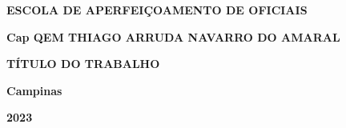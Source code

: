 \documentclass[12pt,a4paper]{article}
\begin{document}
\begin{titlepage}
    \centering
    \onehalfspacing
    \textbf{\Large ESCOLA DE APERFEIÇOAMENTO DE OFICIAIS} %
    
    \vspace{2\baselineskip} %

    \textbf{Cap QEM THIAGO ARRUDA NAVARRO DO AMARAL} %

    \vspace{7\baselineskip} %

    \textbf{TÍTULO DO TRABALHO} %

    \vspace{2\baselineskip} %


    \vspace{\baselineskip} %


    \vfill %

    \vspace{5cm} %

    \textbf{Campinas} %

    \vspace{\baselineskip} %

    \textbf{2023} %
\end{titlepage}

\end{document}
